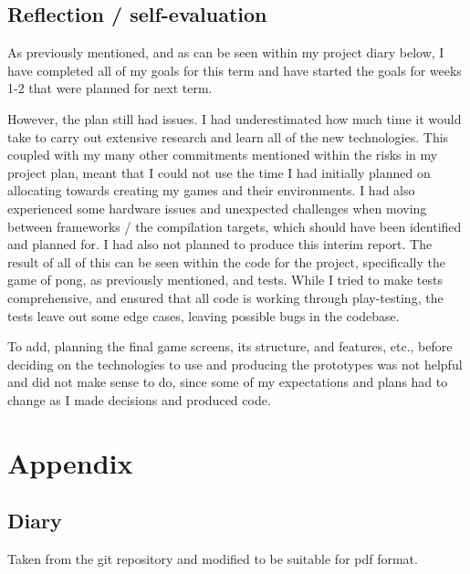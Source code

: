 \documentclass[]{final}
\begin{document}
\section{Reflection / self-evaluation}

As previously mentioned, and as can be seen within my project diary below,
I have completed all of my goals for this term and have
started the goals for weeks 1-2 that were planned for next term.

However, the plan still had issues. I had underestimated how much time it would
take to carry out extensive research and learn all of the new technologies. This
coupled with my many other commitments mentioned within the risks in my project plan,
meant that I could not use the time I had initially planned on allocating towards
creating my games and their environments. I had also experienced some hardware
issues and unexpected challenges when moving between frameworks / the compilation
targets, which should have been identified and planned for. I had also not planned to
produce this interim report. The result of all of this can be seen within the
code for the project, specifically the game of pong, as previously mentioned, and tests. While I tried to make tests comprehensive,
and ensured that all code is working through play-testing, the tests leave out
some edge cases, leaving possible bugs in the codebase.

To add, planning the final game screens, its structure, and features, etc., before
deciding on the technologies to use and producing the prototypes was not helpful and
did not make sense to do, since some of my expectations and plans had to change as I
made decisions and produced code.


\newpage
{}


\chapter{Appendix}
\section{Diary}
Taken from the git repository and modified to be suitable for pdf format.
\end{document}
